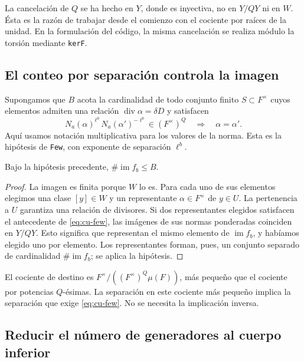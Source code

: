 La cancelación de $Q$ se ha hecho en $Y$, donde es inyectiva, no en $Y/QY$ ni en $W$. Ésta es la razón de trabajar desde el comienzo con el cociente por raíces de la unidad. En la formulación del código, la misma cancelación se realiza módulo la torsión mediante \texttt{kerF}.

\subsection{El conteo por separación controla la imagen}

Supongamos que $B$ acota la cardinalidad de todo conjunto finito $S\subset F^\times$ cuyos elementos admiten una relación $\operatorname{div}\alpha=\delta D$ y satisfacen
\begin{equation}
 N_a(\alpha)^{\ell^b}\,N_a(\alpha')^{-\ell^b}
 \in(F^\times)^Q\quad\Longrightarrow\quad\alpha=\alpha'.
 \label{eq:cu-few}
\end{equation}
Aquí usamos notación multiplicativa para los valores de la norma. Esta es la hipótesis de \texttt{Few}, con exponente de separación $\ell^b$.

\begin{proposicion}
\label{prop:cu-im}
Bajo la hipótesis precedente, $\#\operatorname{im}f_b\le B$.
\end{proposicion}
\begin{proof}
La imagen es finita porque $W$ lo es. Para cada uno de sus elementos elegimos una clase $[y]\in W$ y un representante $\alpha\in F^\times$ de $y\in U$. La pertenencia a $U$ garantiza una relación de divisores. Si dos representantes elegidos satisfacen el antecedente de \eqref{eq:cu-few}, las imágenes de sus normas ponderadas coinciden en $Y/QY$. Esto significa que representan el mismo elemento de $\operatorname{im}f_b$, y habíamos elegido uno por elemento. Los representantes forman, pues, un conjunto separado de cardinalidad $\#\operatorname{im}f_b$; se aplica la hipótesis.
\end{proof}

El cociente de destino es $F^\times/((F^\times)^Q\mu(F))$, más pequeño que el cociente por potencias $Q$-ésimas. La separación en este cociente más pequeño implica la separación que exige \eqref{eq:cu-few}. No se necesita la implicación inversa.

\subsection{Reducir el número de generadores al cuerpo inferior}

